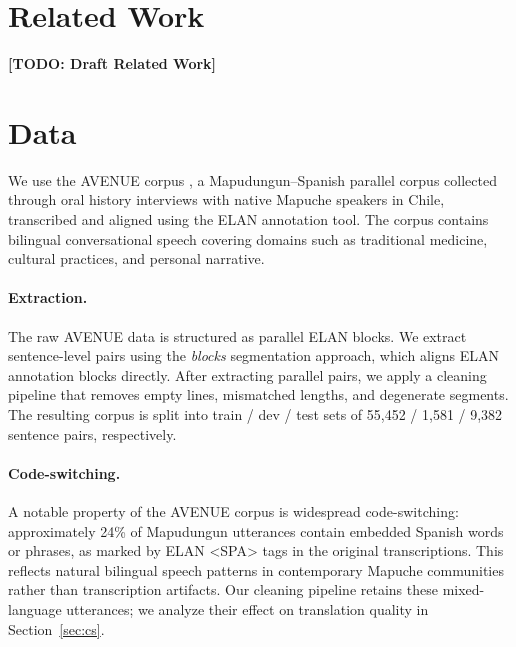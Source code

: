 \documentclass[11pt]{article}
\newcommand{\todo}[1]{\textbf{[TODO: #1]}}
\begin{document}
\section{Related Work}

\todo{Draft Related Work}

\section{Data}

We use the AVENUE corpus \cite{duan2020avenue}, a Mapudungun--Spanish parallel corpus collected through oral history interviews with native Mapuche speakers in Chile, transcribed and aligned using the ELAN annotation tool. The corpus contains bilingual conversational speech covering domains such as traditional medicine, cultural practices, and personal narrative.

\paragraph{Extraction.} The raw AVENUE data is structured as parallel ELAN blocks. We extract sentence-level pairs using the \textit{blocks} segmentation approach, which aligns ELAN annotation blocks directly. After extracting parallel pairs, we apply a cleaning pipeline that removes empty lines, mismatched lengths, and degenerate segments. The resulting corpus is split into train / dev / test sets of 55,452 / 1,581 / 9,382 sentence pairs, respectively.

\paragraph{Code-switching.} A notable property of the AVENUE corpus is widespread code-switching: approximately 24\% of Mapudungun utterances contain embedded Spanish words or phrases, as marked by ELAN \textsc{<SPA>} tags in the original transcriptions. This reflects natural bilingual speech patterns in contemporary Mapuche communities rather than transcription artifacts. Our cleaning pipeline retains these mixed-language utterances; we analyze their effect on translation quality in Section~\ref{sec:cs}.
\end{document}
